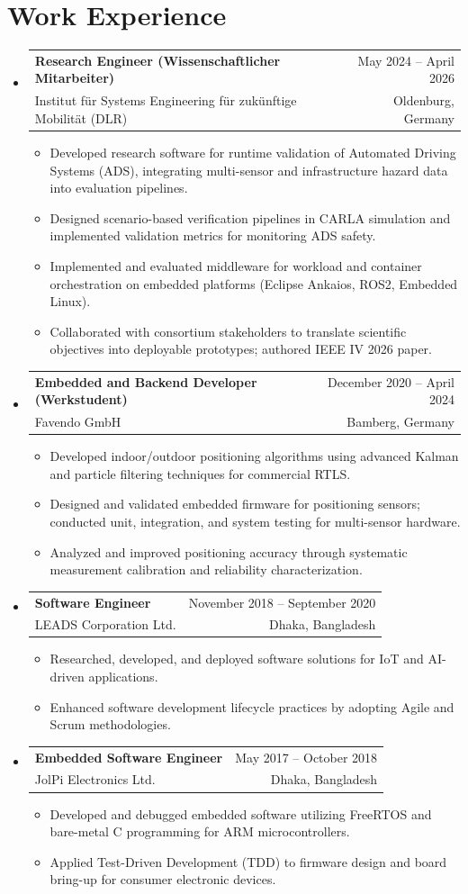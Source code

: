 \documentclass[a4paper,11pt]{article}
\makeatletter
\newcommand{\CVItem}[1]{
  \item\small{
    {#1 \vspace{-2pt}}
  }
}
\newcommand{\CVSubheading}[4]{
  \vspace{-2pt}\item
    \begin{tabular*}{0.97\textwidth}[t]{l@{\extracolsep{\fill}}r}
      \textbf{#1} & #2 \\
      \small#3 & \small #4 \\
    \end{tabular*}\vspace{-7pt}
}
\newcommand{\CVSubHeadingListStart}{\begin{itemize}[leftmargin=0.5cm, label={}]}
\newcommand{\CVSubHeadingListEnd}{\end{itemize}}
\newcommand{\CVItemListStart}{\begin{itemize}}
\newcommand{\CVItemListEnd}{\end{itemize}\vspace{-5pt}}
\makeatother
\begin{document}
\section{Work Experience}
  \CVSubHeadingListStart
    \CVSubheading
      {Research Engineer (Wissenschaftlicher Mitarbeiter)}{May 2024 -- April 2026}
      {Institut für Systems Engineering für zukünftige Mobilität (DLR)}{Oldenburg, Germany}
      \CVItemListStart
        \CVItem{Developed research software for runtime validation of Automated Driving Systems (ADS), integrating multi-sensor and infrastructure hazard data into evaluation pipelines.}
        \CVItem{Designed scenario-based verification pipelines in CARLA simulation and implemented validation metrics for monitoring ADS safety.}
        \CVItem{Implemented and evaluated middleware for workload and container orchestration on embedded platforms (Eclipse Ankaios, ROS2, Embedded Linux).}
        \CVItem{Collaborated with consortium stakeholders to translate scientific objectives into deployable prototypes; authored IEEE IV 2026 paper.}
      \CVItemListEnd

    \CVSubheading
      {Embedded and Backend Developer (Werkstudent)}{December 2020 -- April 2024}
      {Favendo GmbH}{Bamberg, Germany}
      \CVItemListStart
        \CVItem{Developed indoor/outdoor positioning algorithms using advanced Kalman and particle filtering techniques for commercial RTLS.}
        \CVItem{Designed and validated embedded firmware for positioning sensors; conducted unit, integration, and system testing for multi-sensor hardware.}
        \CVItem{Analyzed and improved positioning accuracy through systematic measurement calibration and reliability characterization.}
      \CVItemListEnd

    \CVSubheading
      {Software Engineer}{November 2018 -- September 2020}
      {LEADS Corporation Ltd.}{Dhaka, Bangladesh}
      \CVItemListStart
        \CVItem{Researched, developed, and deployed software solutions for IoT and AI-driven applications.}
        \CVItem{Enhanced software development lifecycle practices by adopting Agile and Scrum methodologies.}
      \CVItemListEnd

    \CVSubheading
      {Embedded Software Engineer}{May 2017 -- October 2018}
      {JolPi Electronics Ltd.}{Dhaka, Bangladesh}
      \CVItemListStart
        \CVItem{Developed and debugged embedded software utilizing FreeRTOS and bare-metal C programming for ARM microcontrollers.}
        \CVItem{Applied Test-Driven Development (TDD) to firmware design and board bring-up for consumer electronic devices.}
      \CVItemListEnd
  \CVSubHeadingListEnd
\end{document}
